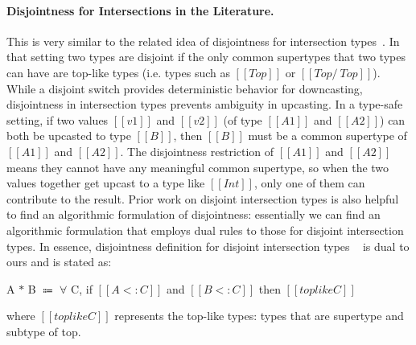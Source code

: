 \paragraph*{Disjointness for Intersections in the Literature.}
This is very similar to the related idea of disjointness for intersection
types~\citep{oliveira2016disjoint}. In that setting two types are disjoint
if the only common supertypes that two types can have are top-like types (i.e.
types such as $[[Top]]$ or $[[Top /\ Top]]$).  While a disjoint switch
provides deterministic behavior for downcasting, disjointness in
intersection types prevents ambiguity in upcasting. In a type-safe
setting, if two values $[[v1]]$ and $[[v2]]$ (of type $[[A1]]$ and
$[[A2]]$) can both be upcasted to type $[[B]]$, then $[[B]]$ must be a common
supertype of $[[A1]]$ and $[[A2]]$.  The disjointness restriction of
$[[A1]]$ and $[[A2]]$ means they cannot have any meaningful common
supertype, so when the two values together get upcast to a type like
$[[Int]]$, only one of them can contribute to the result.
Prior work on disjoint intersection types is also helpful
to find an algorithmic formulation of disjointness: essentially we can find an algorithmic
formulation that employs dual rules to those for disjoint intersection types.
In essence, disjointness definition for disjoint intersection types
~\citep{oliveira2016disjoint} is dual to ours and is stated as:

\begin{definition}
  \label{def:dijoin:intersection:types}
  A $*$ B $\Coloneqq$ $\forall$ C, if $[[A <: C]]$ and $[[B <: C]]$ then $[[toplike C]]$
\end{definition}

\noindent where $[[toplike C]]$ represents the top-like types: types that are supertype and subtype of top.


